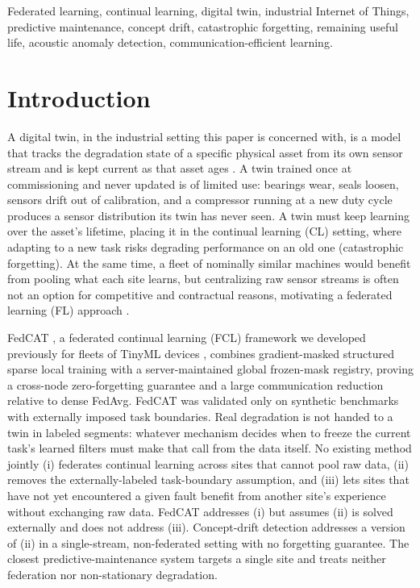 \documentclass[journal]{IEEEtran}
\begin{document}
\begin{IEEEkeywords}
Federated learning, continual learning, digital twin, industrial Internet of Things, predictive maintenance, concept drift, catastrophic forgetting, remaining useful life, acoustic anomaly detection, communication-efficient learning.
\end{IEEEkeywords}

\section{Introduction}

A digital twin, in the industrial setting this paper is concerned with, is a model that tracks the degradation state of a specific physical asset from its own sensor stream and is kept current as that asset ages \cite{tao2019twin}. A twin trained once at commissioning and never updated is of limited use: bearings wear, seals loosen, sensors drift out of calibration, and a compressor running at a new duty cycle produces a sensor distribution its twin has never seen. A twin must keep learning over the asset's lifetime, placing it in the continual learning (CL) setting, where adapting to a new task risks degrading performance on an old one (catastrophic forgetting). At the same time, a fleet of nominally similar machines would benefit from pooling what each site learns, but centralizing raw sensor streams is often not an option for competitive and contractual reasons, motivating a federated learning (FL) approach \cite{mcmahan2017fedavg}.

FedCAT \cite{fedcat2026}, a federated continual learning (FCL) framework we developed previously for fleets of TinyML devices \cite{warden2019tinyml,lin2020mcunet}, combines gradient-masked structured sparse local training with a server-maintained global frozen-mask registry, proving a cross-node zero-forgetting guarantee and a large communication reduction relative to dense FedAvg. FedCAT was validated only on synthetic benchmarks with externally imposed task boundaries. Real degradation is not handed to a twin in labeled segments: whatever mechanism decides when to freeze the current task's learned filters must make that call from the data itself. No existing method jointly (i) federates continual learning across sites that cannot pool raw data, (ii) removes the externally-labeled task-boundary assumption, and (iii) lets sites that have not yet encountered a given fault benefit from another site's experience without exchanging raw data. FedCAT addresses (i) but assumes (ii) is solved externally and does not address (iii). Concept-drift detection \cite{gama2014survey,lu2019review} addresses a version of (ii) in a single-stream, non-federated setting with no forgetting guarantee. The closest predictive-maintenance system \cite{tinyml6g2026} targets a single site and treats neither federation nor non-stationary degradation.
\end{document}
